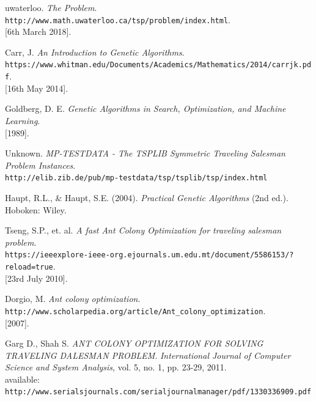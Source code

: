 \documentclass[11pt,a4paper,final]{article}
\begin{document}
	\begin{thebibliography}{9}
		uwaterloo.
		\textit{The Problem}.
		\\\texttt{http://www.math.uwaterloo.ca/tsp/problem/index.html}.
		\\{[6th March 2018]}.
		
		Carr, J.
		\textit{An Introduction to Genetic Algorithms}.
		\\\texttt{https://www.whitman.edu/Documents/Academics/Mathematics/2014/carrjk.pdf}.
		\\{[16th May 2014]}.
		
		Goldberg, D. E.
		\textit{Genetic Algorithms in Search, Optimization, and Machine
			Learning}.
		\\{[1989]}.
		
		Unknown.
		\textit{MP-TESTDATA - The TSPLIB Symmetric Traveling Salesman Problem Instances}.
		\\\texttt{http://elib.zib.de/pub/mp-testdata/tsp/tsplib/tsp/index.html}
		
		Haupt, R.L., \& Haupt, S.E. (2004).
		\textit{Practical Genetic Algorithms} (2nd ed.). Hoboken: Wiley.
		
		Tseng, S.P., et. al.
		\textit{A fast Ant Colony Optimization for traveling salesman problem}.
		\\\texttt{https://ieeexplore-ieee-org.ejournals.um.edu.mt/document/5586153/?reload=true}.
		\\{[23rd July 2010]}.
		
		Dorgio, M.
		\textit{Ant colony optimization}.
		\\\texttt{http://www.scholarpedia.org/article/Ant\_colony\_optimization}.
		\\{[2007]}.
		
		Garg D., Shah S.
		\textit{ANT COLONY OPTIMIZATION FOR SOLVING TRAVELING DALESMAN PROBLEM}.
		\textit{International Journal of Computer Science and System Analysis}, vol. 5, no. 1, pp. 23-29, 2011.\\
		available: \texttt{http://www.serialsjournals.com/serialjournalmanager/pdf/1330336909.pdf}
	\end{thebibliography}	
\end{document}
